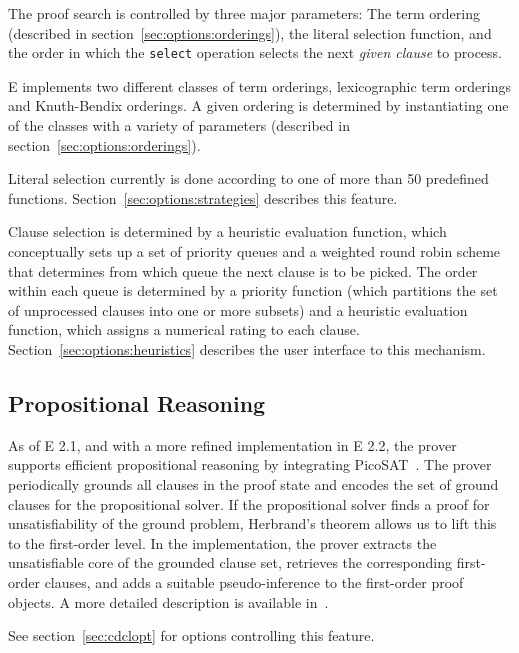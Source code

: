 \documentclass{report}
\begin{document}
The proof search is controlled by three major parameters: The term
ordering (described in section~\ref{sec:options:orderings}), the
literal selection function, and the order in which the \texttt{select}
operation selects the next \emph{given clause} to process.

E implements two different classes of term orderings, lexicographic term orderings and Knuth-Bendix
orderings. A given ordering is determined by instantiating one of the
classes with a variety of parameters (described in
section~\ref{sec:options:orderings}).

Literal selection currently is done according
to one of more than 50 predefined
functions. Section~\ref{sec:options:strategies} describes this
feature.

Clause selection is determined by a heuristic evaluation function,
which conceptually sets up a set of priority queues and a weighted
round robin scheme that determines from which queue the next clause is
to be picked. The order within each queue is determined by a priority
function (which partitions the set of unprocessed clauses into one or
more subsets) and a heuristic evaluation function, which assigns a
numerical rating to each clause.  Section~\ref{sec:options:heuristics}
describes the user interface to this mechanism.


\subsection{Propositional Reasoning}
\label{sec:cdcl}

As of E 2.1, and with a more refined implementation in E 2.2, the
prover supports efficient propositional reasoning by integrating
PicoSAT~\cite{Biere:JSBC-2008}. The prover periodically
grounds all clauses in the proof state and encodes the set of ground
clauses for the propositional solver. If the propositional solver
finds a proof for unsatisfiability of the ground problem, Herbrand's
theorem allows us to lift this to the first-order level. In the
implementation, the prover extracts the unsatisfiable core of the
grounded clause set, retrieves the corresponding first-order clauses,
and adds a suitable pseudo-inference to the first-order proof
objects. A more detailed description is available
in~\cite{Schulz:Vampire-2018}.

See section~\ref{sec:cdclopt} for options controlling this feature.
\end{document}
